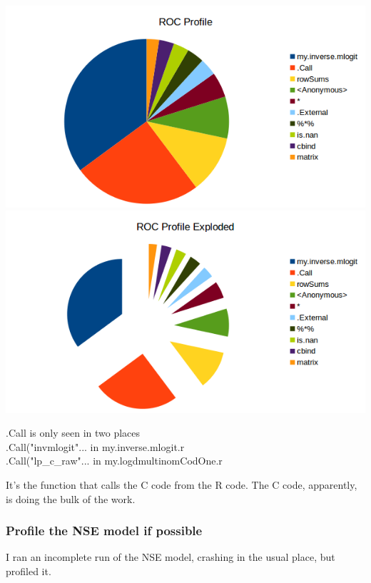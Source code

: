 \includegraphics{data/ROC_Profile}
\includegraphics{data/ROC_Profilexplode}

.Call is only seen in two places\\
.Call("invmlogit"... in my.inverse.mlogit.r\\
.Call("lp\_c\_raw"... in my.logdmultinomCodOne.r

It's the function that calls the C code from the R code. The C code, apparently, is doing the bulk of the work.


\subsubsection{Profile the NSE model if possible}

I ran an incomplete run of the NSE model, crashing in the usual place, but profiled it.



